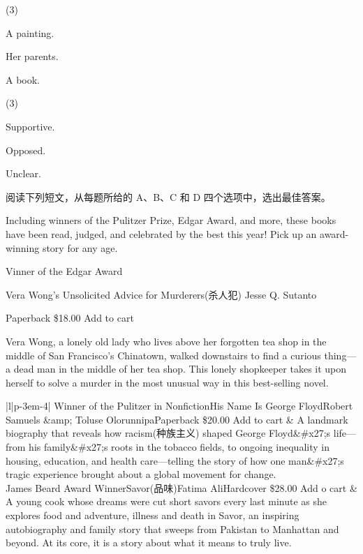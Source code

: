 \documentclass{英语试卷}
\begin{document}
\begin{choices}(3)
  \item A painting.
  \item Her parents.
  \item A book.
\end{choices}
\begin{choices}(3)
  \item Supportive.
  \item Opposed.
  \item Unclear.
\end{choices}
\par 阅读下列短文，从每题所给的 A、B、C 和 D 四个选项中，选出最佳答案。\par
{}
\par Including winners of the Pulitzer Prize, Edgar Award, and more, these books have been read, judged, and celebrated by the best this year! Pick up an award-winning story for any age.\par
\par Vinner of the Edgar Award\par
\par Vera Wong's Unsolicited Advice for Murderers(杀人犯) Jesse Q. Sutanto\par
\par Paperback \$18.00 Add to cart\par
\par Vera Wong, a lonely old lady who lives above her forgotten tea shop in the middle of San Francisco's Chinatown, walked downstairs to find a curious thing—a dead man in the middle of her tea shop. This lonely shopkeeper takes it upon herself to solve a murder in the most unusual way in this best-selling novel.\par
\par\vspace{0.4em}
\begin{center}\begin{tabular}{{|l|p{\dimexpr\linewidth-3em-4\tabcolsep}|}}
\hline
Winner of the Pulitzer in NonfictionHis Name Is George FloydRobert Samuels \&amp; Toluse OlorunnipaPaperback \$20.00 Add to cart & A landmark biography that reveals how racism(种族主义) shaped George Floyd\&\#x27;s life—from his family\&\#x27;s roots in the tobacco fields, to ongoing inequality in housing, education, and health care—telling the story of how one man\&\#x27;s tragic experience brought about a global movement for change. \\
James Beard Award WinnerSavor(品味)Fatima AliHardcover \$28.00 Add o cart & A young cook whose dreams were cut short savors every last minute as she explores food and adventure, illness and death in Savor, an inspiring autobiography and family story that sweeps from Pakistan to Manhattan and beyond. At its core, it is a story about what it means to truly live. \\
\hline
\end{tabular}\end{center}
\end{document}
